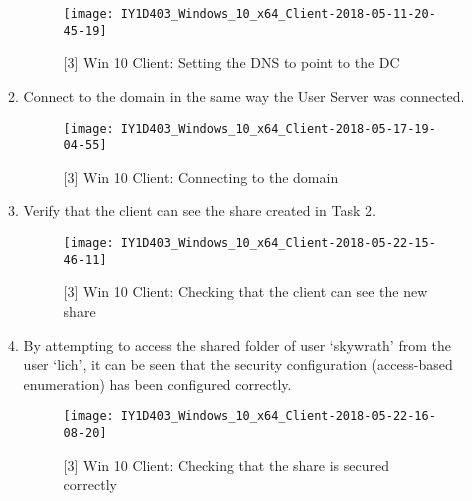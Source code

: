 \begin{enumerate}[series=task3methodology1]
\begin{enumerate}[label=(\alph*)]
        \begin{figure}[H]
          \centering
          \captionsetup{skip=2pt}
          \texttt{[image: IY1D403\_Windows\_10\_x64\_Client-2018-05-11-20-45-19]}
          \caption{[3] Win 10 Client: Setting the DNS to point to the DC}
          \label{fig:task3:win10client_03}
        \end{figure}
      \item Connect to the domain in the same way the User Server was connected.
        \begin{figure}[H]
          \centering
          \captionsetup{skip=2pt}
          \texttt{[image: IY1D403\_Windows\_10\_x64\_Client-2018-05-17-19-04-55]}
          \caption{[3] Win 10 Client: Connecting to the domain}
          \label{fig:task3:win10client_04}
        \end{figure}
      \item Verify that the client can see the share created in Task 2.
        \begin{figure}[H]
          \centering
          \captionsetup{skip=2pt}
          \texttt{[image: IY1D403\_Windows\_10\_x64\_Client-2018-05-22-15-46-11]}
          \caption{[3] Win 10 Client: Checking that the client can see the new share}
          \label{fig:task2:vspherec_ussfx}
        \end{figure}
      \item By attempting to access the shared folder of user `skywrath' from the user `lich', it can be seen that the security configuration (access-based enumeration) has been configured correctly.
        \begin{figure}[H]
          \centering
          \captionsetup{skip=2pt}
          \texttt{[image: IY1D403\_Windows\_10\_x64\_Client-2018-05-22-16-08-20]}
          \caption{[3] Win 10 Client: Checking that the share is secured correctly}
          \label{fig:task2:vspherec_ussfx2}
        \end{figure}
    \end{enumerate}
\end{enumerate}

